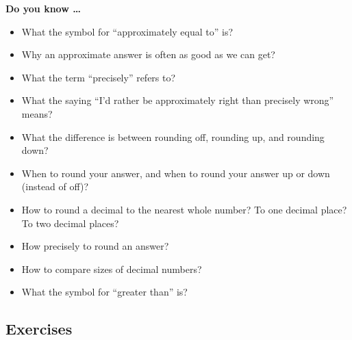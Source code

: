  

\noindent \textbf{Do you know \ldots}

\begin{itemize}
\item What the symbol for ``approximately equal to'' is? %
\item Why an approximate answer is often as good as we can get? %
\item What the term ``precisely'' refers to? %
\item What the saying ``I'd rather be approximately right than precisely wrong'' means? %
\item What the difference is between rounding off, rounding up, and rounding down? %
\item When to round your answer, and when to round your answer up or down (instead of off)? %
\item How to round a decimal to the nearest whole number? %
To one decimal place? %
To two decimal places? %
\item How precisely to round an answer? %
\item How to compare sizes of decimal numbers? %
\item What the symbol for ``greater than'' is? %
  
\end{itemize}


\subsection*{Exercises}

